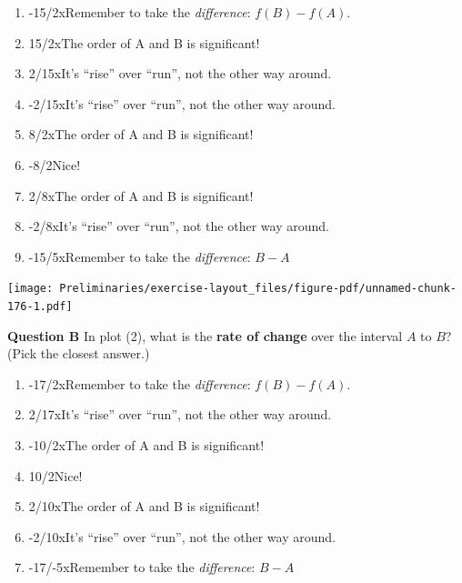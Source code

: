 \documentclass[
  letterpaper,
  DIV=11,
  numbers=noendperiod,
  oneside]{article}
\providecommand{\tightlist}{%
  \setlength{\itemsep}{0pt}\setlength{\parskip}{0pt}}\usepackage{longtable,booktabs,array}
\begin{document}
\begin{multicols}{2}
\begin{enumerate}
\def\labelenumi{\roman{enumi}.}
\tightlist
\item
  {-15/2{xRemember to take the \emph{difference}: \(f(B) - f(A)\).}}\\
\item
  {15/2{xThe order of A and B is significant!}}\\
\item
  {2/15{xIt's ``rise'' over ``run'', not the other way around.}}\\
\item
  {-2/15{xIt's ``rise'' over ``run'', not the other way around.}}\\
\item
  {8/2{xThe order of A and B is significant!}}\\
\item
  {-8/2{Nice!~}}\\
\item
  {2/8{xThe order of A and B is significant!}}\\
\item
  {-2/8{xIt's ``rise'' over ``run'', not the other way around.}}\\
\item
  {-15/5{xRemember to take the \emph{difference}: \(B - A\)}}
\end{enumerate}

\texttt{[image: Preliminaries/exercise-layout\_files/figure-pdf/unnamed-chunk-176-1.pdf]}

\textbf{Question B} In plot (2), what is the \textbf{rate of change}
over the interval \(A\) to \(B\)? (Pick the closest answer.)

\begin{enumerate}
\def\labelenumi{\roman{enumi}.}
\tightlist
\item
  {-17/2{xRemember to take the \emph{difference}: \(f(B) - f(A)\).}}\\
\item
  {2/17{xIt's ``rise'' over ``run'', not the other way around.}}\\
\item
  {-10/2{xThe order of A and B is significant!}}\\
\item
  {10/2{Nice!~}}\\
\item
  {2/10{xThe order of A and B is significant!}}\\
\item
  {-2/10{xIt's ``rise'' over ``run'', not the other way around.}}\\
\item
  {-17/-5{xRemember to take the \emph{difference}: \(B - A\)}}
\end{enumerate}


\end{multicols}
\end{document}
